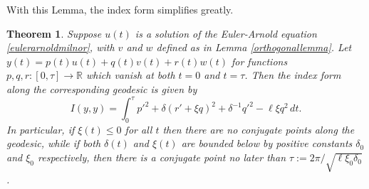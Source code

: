 \documentclass[oneside, 11pt]{amsart}
\newtheorem{theorem}{Theorem}[section]
\numberwithin{equation}{section}
\begin{document}
With this Lemma, the index form simplifies greatly. 
\begin{theorem}\label{3dunimodularthm}
Suppose $u(t)$ is a solution of the Euler-Arnold equation \eqref{eulerarnoldmilnor}, with $v$ and $w$ defined as in Lemma \ref{orthogonallemma}. 
Let $y(t) = p(t)u(t)+q(t)v(t)+r(t)w(t)$ for functions $p,q,r\colon [0,\tau]\to \mathbb{R}$ which vanish at both $t=0$ and $t=\tau$. Then the index form along the corresponding geodesic is given by 
\begin{equation}\label{indexmilnor}
I(y,y) = \int_0^{\tau} p'^2 + \delta (r' + \xi q)^2 + \delta^{-1} q'^2 - \ell \xi q^2 \, dt.
\end{equation}
In particular, if $\xi(t)\le 0$ for all $t$ then there are no conjugate points along the geodesic, while if both $\delta(t)$ and $\xi(t)$ are bounded below by positive constants $\delta_0$ and $\xi_0$ respectively, then there is a conjugate point no later than $\tau := 2\pi/\sqrt{\ell \xi_0\delta_0}$. 
\end{theorem}
\end{document}
